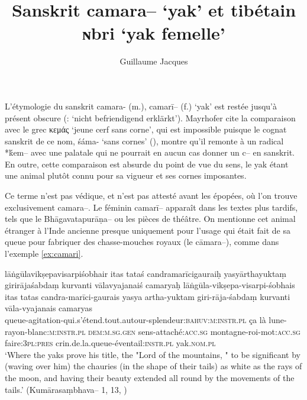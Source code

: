 \documentclass[oldfontcommands,oneside,a4paper,11pt]{article}
\newcommand{\ipa}[1]{{\phon #1}} %
\newcommand{\grec}[1]{{\mleccha #1}}
\begin{document}
 
\title{Sanskrit \ipa{camara--} `yak' et tibétain \ipa{ɴbri} `yak femelle'}
\author{Guillaume Jacques}
\maketitle
L'étymologie du sanskrit \ipa{camara-} (m.), \ipa{camarī--} (f.) `yak' est restée jusqu'à présent obscure (\citealt[I, 375]{mayrhofer56kurz}: `nicht befriendigend erklärkt'). Mayrhofer cite la comparaison avec le grec \grec{κεμάς} `jeune cerf sans corne', qui est impossible puisque le cognat sanskrit de ce nom, \ipa{śáma-} `sans cornes' (\citealt[II, 289]{mayrhofer56kurz}), montre qu'il remonte à un radical *\ipa{ḱem--} avec une palatale qui ne pourrait en aucun cas donner un \ipa{c--} en sanskrit. En outre, cette comparaison est absurde du point de vue du sens, le yak étant une animal plutôt connu pour sa vigueur et ses cornes imposantes.


Ce terme n'est pas védique, et n'est pas attesté avant les épopées, où l'on trouve exclusivement   \ipa{camara--}.  Le féminin \ipa{camarī--} apparaît dans les textes plus tardifs, tels que le \ipa{Bhāgavatapurāṇa--} ou les pièces de théâtre. On mentionne cet animal étranger à l'Inde ancienne presque uniquement pour l'usage qui était fait de sa queue pour fabriquer des chasse-mouches royaux (le  \ipa{cāmara--}), comme dans l'exemple \ref{ex:camari}.

\begin{exe}
\ex \label{ex:camari}
\glt lāṅgūlavikṣepavisarpiśobhair itas tataś candramarīcigauraiḥ 
\glt yasyārthayuktaṃ girirājaśabdaṃ kurvanti vālavyajanaiś camaryaḥ 
\gll lāṅgūla-vikṣepa-visarpi-śobhais itas tatas candra-marīci-gaurais yasya artha-yuktam giri-rāja-śabdaṃ kurvanti vāla-vyajanais camaryas \\
queue-agitation-qui.s'étend.tout.autour-splendeur:\textsc{bahuv:m:instr.pl} ça là lune-rayon-blanc:\textsc{m:instr.pl} \textsc{dem:m.sg.gen} sens-attaché:\textsc{acc.sg} montagne-roi-mot:\textsc{acc.sg} faire:\textsc{3pl:pres} crin.de.la.queue-éventail\textsc{:instr.pl} yak.\textsc{nom.pl} \\
\glt  `Where the yaks prove his title, the "Lord of the mountains, " to be significant by (waving over him) the chauries (in the shape of their tails) as white as the rays of the moon, and having their beauty extended all round by the movements of the tails.' (\ipa{Kumārasaṃbhava--} 1, 13, \citealt[204]{kale17kumarasambhava})
\end{exe}
\end{document}
